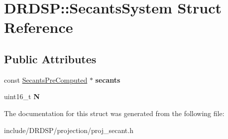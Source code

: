\hypertarget{struct_d_r_d_s_p_1_1_secants_system}{\section{D\-R\-D\-S\-P\-:\-:Secants\-System Struct Reference}
\label{struct_d_r_d_s_p_1_1_secants_system}
}
\subsection*{Public Attributes}
\begin{DoxyCompactItemize}
\item 
\hypertarget{struct_d_r_d_s_p_1_1_secants_system_a9c69d703c71a37c58cf9202ef8726336}{const \hyperlink{struct_d_r_d_s_p_1_1_secants_pre_computed}{Secants\-Pre\-Computed} $\ast$ {\bfseries secants}}\label{struct_d_r_d_s_p_1_1_secants_system_a9c69d703c71a37c58cf9202ef8726336}

\item 
\hypertarget{struct_d_r_d_s_p_1_1_secants_system_ac656492eccbaef7e14330fdacfbecdb2}{uint16\-\_\-t {\bfseries N}}\label{struct_d_r_d_s_p_1_1_secants_system_ac656492eccbaef7e14330fdacfbecdb2}

\end{DoxyCompactItemize}


The documentation for this struct was generated from the following file\-:\begin{DoxyCompactItemize}
\item 
include/\-D\-R\-D\-S\-P/projection/proj\-\_\-secant.\-h\end{DoxyCompactItemize}
